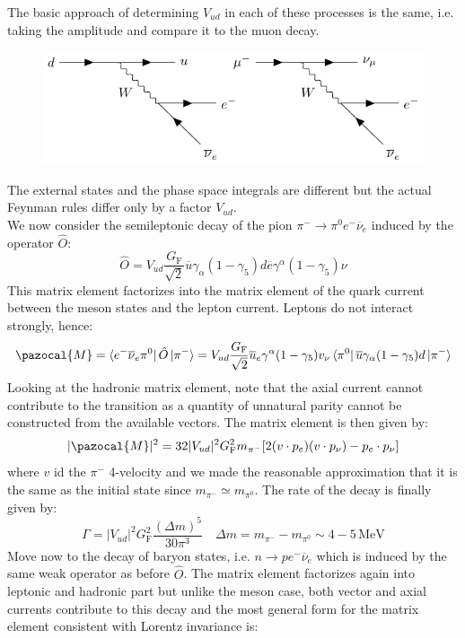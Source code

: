 \documentclass[../main.tex]{subfiles}
\begin{document}
The basic approach of determining $V_{ud}$ in each of these processes is the same, i.e. taking the amplitude and compare it to the muon decay.
\begin{figure}[h]
    \centering
    \includegraphics{Images/Vud.pdf}
    \caption*{}
\end{figure}
The external states and the phase space integrals are different but the actual Feynman rules differ only by a factor $V_{ud}$.\\
We now consider the semileptonic decay of the pion $\pi^-\to\pi^0e^-\overline{\nu}_e$ induced by the operator $\hat{O}$:
\[
\hat{O}=V_{ud}\frac{G_{\text{F}}}{\sqrt{2}}\overline{u}\gamma_\alpha(1-\gamma_5)d\overline{e}\gamma^\alpha(1-\gamma_5)\nu
\]
This matrix element factorizes into the matrix element of the quark current between the meson states and the lepton current. Leptons do not interact strongly, hence:
\[
\pazocal{M}=\bra{e^-\overline{\nu}_e\pi^0}\hat{O}\ket{\pi^-}=V_{ud}\frac{G_{\text{F}}}{\sqrt{2}}\overline{u}_e\gamma^\alpha(1-\gamma_5)v_\nu\bra{\pi^0}\overline{u}\gamma_\alpha(1-\gamma_5)d\ket{\pi^-}
\]
Looking at the hadronic matrix element, note that the axial current cannot contribute to the transition as a quantity of unnatural parity cannot be constructed from the available vectors. The matrix element is then given by:
\[
|\pazocal{M}|^2=32|V_{ud}|^2G_{\text{F}}^2m_{\pi^-}[2(v\cdot p_e)(v\cdot p_\nu)-p_e\cdot p_\nu]
\]
where $v$ id the $\pi^-$ 4-velocity and we made the reasonable approximation that it is the same as the initial state since $m_{\pi^-}\simeq m_{\pi^0}$. The rate of the decay is finally given by:
\[
\Gamma=|V_{ud}|^2G_{\text{F}}^2\frac{(\Delta m)^5}{30\pi^3} \quad \Delta m=m_{\pi^-}-m_{\pi^0}\sim 4-5\,\text{MeV}
\]
Move now to the decay of baryon states, i.e. $n\to pe^-\overline{\nu}_e$ which is induced by the same weak operator as before $\hat{O}$. The matrix element factorizes again into leptonic and hadronic part but unlike the meson case, both vector and axial currents contribute to this decay and the most general form for the matrix element consistent with Lorentz invariance is:
\end{document}
